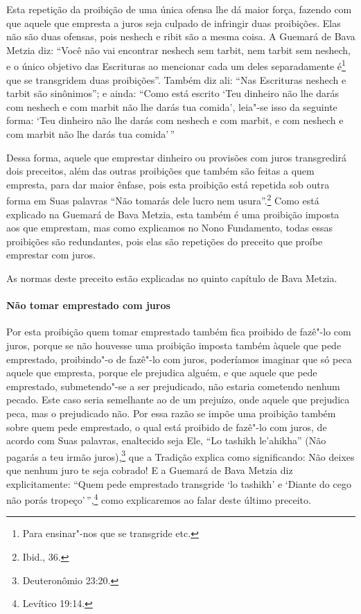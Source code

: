 \begin{multicols}{2}
Esta repetição da proibição de uma única ofensa lhe dá maior força,
fazendo com que aquele que empresta a juros seja culpado de infringir
duas proibições. Elas não são duas ofensas, pois neshech\starr{} e ribit\starr{}
são a mesma coisa. A Guemará\starr{} de Bava Metzia\starr{} diz: ``Você não vai
encontrar neshech\starr{} sem tarbit\starr, nem tarbit\starr{} sem neshech\starr, e o único
objetivo das Escrituras ao mencionar cada um deles separadamente
é\footnote{Para ensinar"-nos que se transgride etc.} que se transgridem duas proibições''. Também diz
ali: ``Nas Escrituras neshech\starr{} e tarbit\starr{} são sinônimos''; e ainda:
``Como está escrito `Teu dinheiro não lhe darás com neshech\starr{} e com
marbit\starr{} não lhe darás tua comida', leia"-se isso da seguinte forma:
`Teu dinheiro não lhe darás com neshech\starr{} e com marbit\starr, e com
neshech\starr{} e com marbit\starr{} não lhe darás tua comida'\,''

Dessa forma, aquele que emprestar dinheiro ou provisões com juros
transgredirá dois preceitos, além das outras proibições que também são
feitas a quem empresta, para dar maior ênfase, pois esta proibição está
repetida sob outra forma em Suas palavras ``Não tomarás dele lucro nem
usura''.\footnote{Ibid., 36.} Como está explicado na Guemará\starr{} de Bava Metzia\starr, esta
também é uma proibição imposta aos que emprestam, mas como explicamos
no Nono Fundamento, todas essas proibições são redundantes, pois elas
são repetições do preceito que proíbe emprestar com juros.

As normas deste preceito estão explicadas no quinto capítulo de Bava Metzia\starr.

\paragraph{Não tomar emprestado com juros}

Por esta proibição quem tomar emprestado também fica proibido de fazê"-lo
com juros, porque se não houvesse uma proibição imposta também àquele
que pede emprestado, proibindo"-o de fazê"-lo com juros, poderíamos
imaginar que só peca aquele que empresta, porque ele prejudica alguém, e
que aquele que pede emprestado, submetendo"-se a ser prejudicado, não
estaria cometendo nenhum pecado. Este caso seria semelhante ao de um
prejuízo, onde aquele que prejudica peca, mas o prejudicado não. Por
essa razão se impõe uma proibição também sobre quem pede emprestado, o
qual está proibido de fazê"-lo com juros, de acordo com Suas palavras,
enaltecido seja Ele, ``Lo tashikh le'ahikha'' (Não pagarás a teu irmão
juros),\footnote{Deuteronômio 23:20.} que a Tradição explica como significando:
Não deixes que nenhum juro te seja cobrado! E a Guemará\starr{} de Bava Metzia\starr{}
diz explicitamente: ``Quem pede emprestado transgride `lo tashikh' e
`Diante do cego não porás tropeço'\,'',\footnote{Levítico 19:14.} como explicaremos
ao falar deste último preceito.


\end{multicols}
